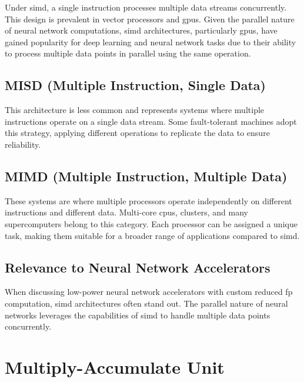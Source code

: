 Under \gls{simd}, a single instruction processes multiple data streams concurrently. This design is prevalent in vector processors and \glspl{gpu}. Given the parallel nature of neural network computations, \gls{simd} architectures, particularly \glspl{gpu}, have gained popularity for deep learning and neural network tasks due to their ability to process multiple data points in parallel using the same operation.

\subsection*{MISD (Multiple Instruction, Single Data)}

This architecture is less common and represents systems where multiple instructions operate on a single data stream. Some fault-tolerant machines adopt this strategy, applying different operations to replicate the data to ensure reliability.

\subsection*{MIMD (Multiple Instruction, Multiple Data)}

These systems are where multiple processors operate independently on different instructions and different data. Multi-core \glspl{cpu}, clusters, and many supercomputers belong to this category. Each processor can be assigned a unique task, making them suitable for a broader range of applications compared to \gls{simd}.

\subsection*{Relevance to Neural Network Accelerators}

When discussing low-power neural network accelerators with custom reduced \gls{fp} computation, \gls{simd} architectures often stand out. The parallel nature of neural networks leverages the capabilities of \gls{simd} to handle multiple data points concurrently.

\section{Multiply-Accumulate Unit}

